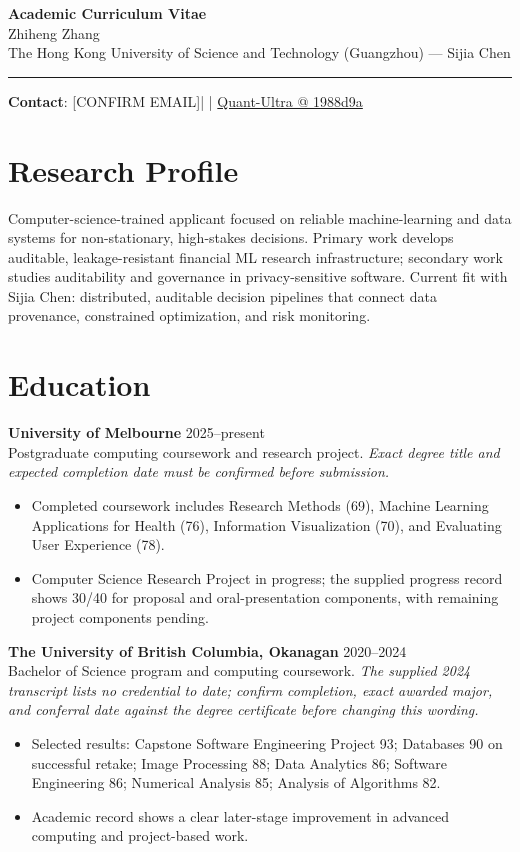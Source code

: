 \documentclass[11pt]{article}
\makeatletter
\newcommand{\ApplicantName}{Zhiheng Zhang}
\newcommand{\ApplicantEmail}{[CONFIRM EMAIL]}
\newcommand{\ApplicantPhone}{[CONFIRM PHONE]}
\newcommand{\ApplicantGitHub}{\href{https://github.com/zhiheng-zhang-Mera/Quant-Ultra/tree/1988d9a8530da91a8158de864d098ea869098923}{Quant-Ultra @ 1988d9a}}
\makeatother
\begin{document}
\begin{center}
{\LARGE\bfseries Academic Curriculum Vitae}\\[0.25em]
{\large \ApplicantName}\\
The Hong Kong University of Science and Technology (Guangzhou) --- Sijia Chen
\end{center}
\vspace{0.35em}\hrule\vspace{0.65em}

\textbf{Contact}: \ApplicantEmail\quad | \quad \ApplicantPhone\quad | \quad \ApplicantGitHub

\section*{Research Profile}
Computer-science-trained applicant focused on reliable machine-learning and data systems for non-stationary, high-stakes decisions. Primary work develops auditable, leakage-resistant financial ML research infrastructure; secondary work studies auditability and governance in privacy-sensitive software. Current fit with Sijia Chen: distributed, auditable decision pipelines that connect data provenance, constrained optimization, and risk monitoring.

\section*{Education}
\textbf{University of Melbourne} \hfill 2025--present\\
Postgraduate computing coursework and research project. \textit{Exact degree title and expected completion date must be confirmed before submission.}
\begin{itemize}
\item Completed coursework includes Research Methods (69), Machine Learning Applications for Health (76), Information Visualization (70), and Evaluating User Experience (78).
\item Computer Science Research Project in progress; the supplied progress record shows 30/40 for proposal and oral-presentation components, with remaining project components pending.
\end{itemize}

\textbf{The University of British Columbia, Okanagan} \hfill 2020--2024\\
Bachelor of Science program and computing coursework. \textit{The supplied 2024 transcript lists no credential to date; confirm completion, exact awarded major, and conferral date against the degree certificate before changing this wording.}
\begin{itemize}
\item Selected results: Capstone Software Engineering Project 93; Databases 90 on successful retake; Image Processing 88; Data Analytics 86; Software Engineering 86; Numerical Analysis 85; Analysis of Algorithms 82.
\item Academic record shows a clear later-stage improvement in advanced computing and project-based work.
\end{itemize}
\end{document}
